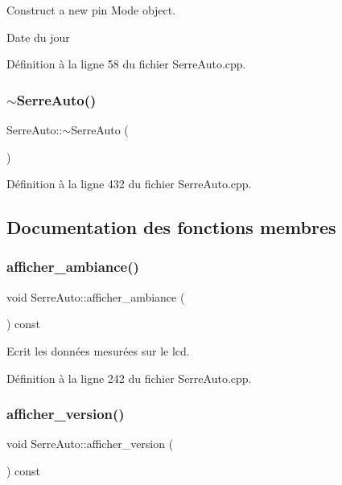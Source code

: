 Construct a new pin Mode object. 

Date du jour 

Définition à la ligne 58 du fichier Serre\+Auto.\+cpp.

\mbox{\label{class_serre_auto_a5639b2ad1f2e20db5a181fe432f2453d}} 
\subsubsection{$\sim$\+Serre\+Auto()}
{\footnotesize\ttfamily Serre\+Auto\+::$\sim$\+Serre\+Auto (\begin{DoxyParamCaption}{ }\end{DoxyParamCaption})\hspace{0.3cm}{\ttfamily [virtual]}}



Définition à la ligne 432 du fichier Serre\+Auto.\+cpp.



\subsection{Documentation des fonctions membres}
\mbox{\label{class_serre_auto_a35c80d7b955ea2e529219931934a640d}} 
\subsubsection{afficher\+\_\+ambiance()}
{\footnotesize\ttfamily void Serre\+Auto\+::afficher\+\_\+ambiance (\begin{DoxyParamCaption}{ }\end{DoxyParamCaption}) const}



Ecrit les données mesurées sur le lcd. 



Définition à la ligne 242 du fichier Serre\+Auto.\+cpp.

\mbox{\label{class_serre_auto_a792f6d2a7340dd3e778d12ad3c6ae2e5}} 
\subsubsection{afficher\+\_\+version()}
{\footnotesize\ttfamily void Serre\+Auto\+::afficher\+\_\+version (\begin{DoxyParamCaption}{ }\end{DoxyParamCaption}) const}



